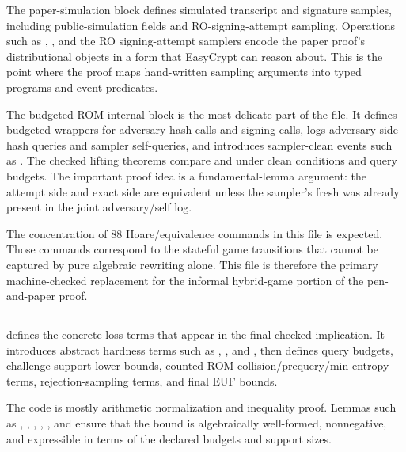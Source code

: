 The paper-simulation block defines simulated transcript and signature samples,
including public-simulation fields and RO-signing-attempt sampling.  Operations
such as ,
, and the RO signing-attempt samplers encode the
paper proof's distributional objects in a form that EasyCrypt can reason about.
This is the point where the proof maps hand-written sampling arguments into
typed programs and event predicates.

The budgeted ROM-internal block is the most delicate part of the file.  It
defines budgeted wrappers for adversary hash calls and signing calls, logs
adversary-side hash queries and sampler self-queries, and introduces
sampler-clean events such as .  The checked
lifting theorems compare
 and
 under clean conditions and query
budgets.  The important proof idea is a fundamental-lemma argument: the attempt
side and exact side are equivalent unless the sampler's fresh
 was already present in the joint adversary/self
log.

The concentration of 88 Hoare/equivalence commands in this file is expected.
Those commands correspond to the stateful game transitions that cannot be
captured by pure algebraic rewriting alone.  This file is therefore the primary
machine-checked replacement for the informal hybrid-game portion of the
pen-and-paper proof.

\subsection[HAETAE\_Reductions.ec]{\texorpdfstring{}{HAETAE\_Reductions.ec}}

 defines the concrete loss terms that appear in
the final checked implication.  It introduces abstract hardness terms such as
, , and
, then defines query budgets,
challenge-support lower bounds, counted ROM collision/prequery/min-entropy
terms, rejection-sampling terms, and final EUF bounds.

The code is mostly arithmetic normalization and inequality proof.  Lemmas such
as ,
,
,
,
, and
 ensure that the
bound is algebraically well-formed, nonnegative, and expressible in terms of the
declared budgets and support sizes.

